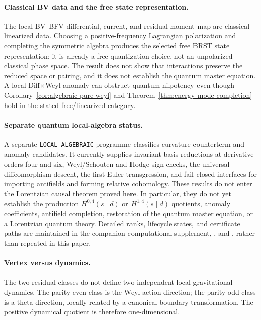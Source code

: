 \documentclass[11pt]{article}
\theoremstyle{definition}
\theoremstyle{remark}
\begin{document}
\paragraph{Classical BV data and the free state representation.}
The local BV--BFV differential, current, and residual moment map are
classical linearized data.  Choosing a positive-frequency Lagrangian
polarization and completing the symmetric algebra produces the selected free
BRST state representation; it is already a free quantization choice, not an
unpolarized classical phase space.  The result does not show that interactions
preserve the reduced space or pairing, and it does not establish the quantum
master equation.  A local Diff$\times$Weyl anomaly can obstruct quantum
nilpotency even though Corollary~\ref{cor:algebraic-pure-weyl} and
Theorem~\ref{thm:energy-mode-completion} hold in the stated free/linearized
category.

\paragraph{Separate quantum local-algebra status.}
A separate \texttt{LOCAL-ALGEBRAIC} programme classifies curvature
counterterm and anomaly candidates.  It currently supplies invariant-basis
reductions at derivative orders four and six, Weyl/Schouten and Hodge-sign
checks, the universal diffeomorphism descent, the first Euler transgression,
and fail-closed interfaces for importing antifields and forming relative
cohomology.  These results do not enter the Lorentzian causal theorem proved
here.  In particular, they do not yet establish the production
$H^{0,4}(s\mid d)$ or $H^{1,4}(s\mid d)$ quotients, anomaly coefficients,
antifield completion, restoration of the quantum master equation, or a
Lorentzian quantum theory.  Detailed ranks, lifecycle states, and certificate
paths are maintained in the companion computational supplement,
, and , rather than
repeated in this paper.
\paragraph{Vertex versus dynamics.}
The two residual classes do not define two independent local gravitational
dynamics.  The parity-even class is the Weyl action direction; the
parity-odd class is a theta direction, locally related by a canonical
boundary transformation.  The positive dynamical quotient is therefore
one-dimensional.
\end{document}
